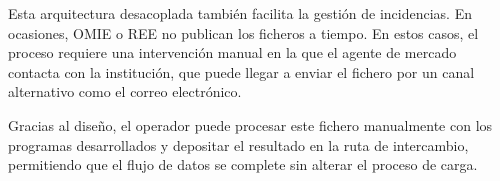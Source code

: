 Esta arquitectura desacoplada también facilita la gestión de incidencias. En ocasiones, OMIE o REE no publican los ficheros a tiempo. En estos casos, el proceso requiere una intervención manual en la que el agente de mercado contacta con la institución, que puede llegar a enviar el fichero por un canal alternativo como el correo electrónico.

Gracias al diseño, el operador puede procesar este fichero manualmente con los programas desarrollados y depositar el resultado en la ruta de intercambio, permitiendo que el flujo de datos se complete sin alterar el proceso de carga.
